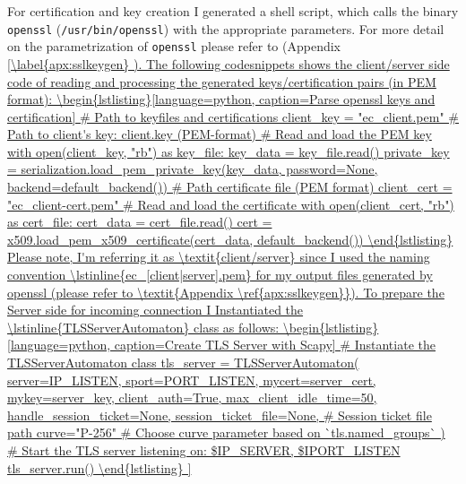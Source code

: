 \documentclass[10pt,a4paper]{article}
\begin{document}
For certification and key creation I generated a shell script, which calls the binary \lstinline{openssl} (\lstinline{/usr/bin/openssl}) with the appropriate parameters. For more detail on the parametrization of \lstinline{openssl} please refer to (Appendix \ref{\label{apx:sslkeygen} ).

The following codesnippets shows the client/server side code of reading and processing the generated keys/certification pairs (in PEM format):

\begin{lstlisting}[language=python, caption=Parse openssl keys and certification]
# Path to keyfiles and certifications
client_key = "ec_client.pem"  # Path to client's key: client.key (PEM-format)

# Read and load the PEM key
with open(client_key, "rb") as key_file:
    key_data = key_file.read()
    private_key = serialization.load_pem_private_key(key_data, password=None, backend=default_backend())

# Path certificate file (PEM format)
client_cert = "ec_client-cert.pem"

# Read and load the certificate
with open(client_cert, "rb") as cert_file:
    cert_data = cert_file.read()
    cert = x509.load_pem_x509_certificate(cert_data, default_backend())
\end{lstlisting}

Please note, I'm referring it as \textit{client/server} since I used the naming convention \lstinline{ec_[client|server].pem} for my output files generated by openssl (please refer to \textit{Appendix \ref{apx:sslkeygen}}).

To prepare the Server side for incoming connection I Instantiated the \lstinline{TLSServerAutomaton}  class as follows:

\begin{lstlisting}[language=python, caption=Create TLS Server with Scapy]
    
# Instantiate the TLSServerAutomaton class
tls_server = TLSServerAutomaton(
    server=IP_LISTEN, 
    sport=PORT_LISTEN, 
    mycert=server_cert,
    mykey=server_key,
    client_auth=True,           
    max_client_idle_time=50,    
    handle_session_ticket=None, 
    session_ticket_file=None,   # Session ticket file path
    curve="P-256"               # Choose curve parameter based on `tls.named_groups`
)

# Start the TLS server listening on: $IP_SERVER, $IPORT_LISTEN
tls_server.run()
\end{lstlisting}

}
\end{document}

